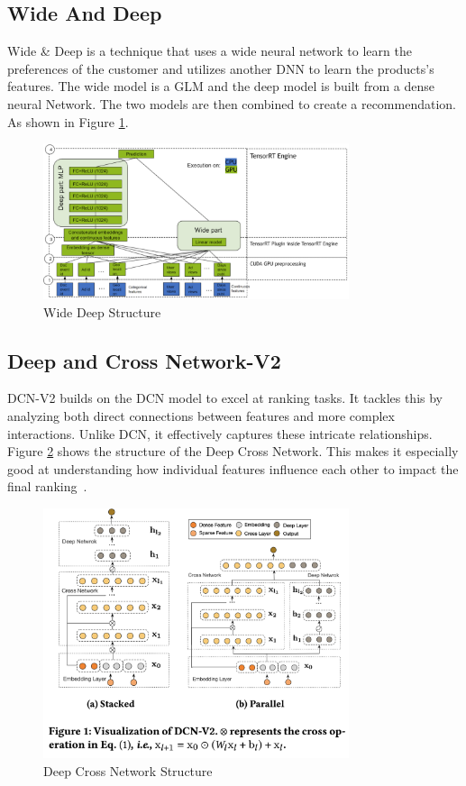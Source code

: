 \subsection{Wide And Deep}
Wide \& Deep is a technique that uses a wide neural network to learn the preferences of the customer and utilizes another DNN to learn the products's features. The wide model is a GLM and the deep model is built from a dense neural Network. The two models are then combined to create a recommendation. As shown in Figure \ref{fig:wide-deep}.
\begin{figure}[H]
    \centering
    \includegraphics[width=0.8\textwidth]{assets/wide_deep.png}
    \caption[Wide Deep Structure]{Wide Deep Structure~\cite{NvidiaRecSys}}
    \label{fig:wide-deep}
\end{figure}
\subsection{Deep and Cross Network-V2}
DCN-V2 builds on the DCN model to excel at ranking tasks. It tackles this by analyzing both direct connections between features and more complex interactions. Unlike DCN, it effectively captures these intricate relationships. Figure \ref{fig:deep-cross-network} shows the structure of the Deep Cross Network. This makes it especially good at understanding how individual features influence each other to impact the final ranking~\cite{DCNv2}.
\begin{figure}[H]
    \centering
    \includegraphics[width=0.8\textwidth]{assets/dcn-v2.png}
    \caption[Deep Cross Network Structure]{Deep Cross Network Structure~\cite{DCNv2}}
    \label{fig:deep-cross-network}
\end{figure}

